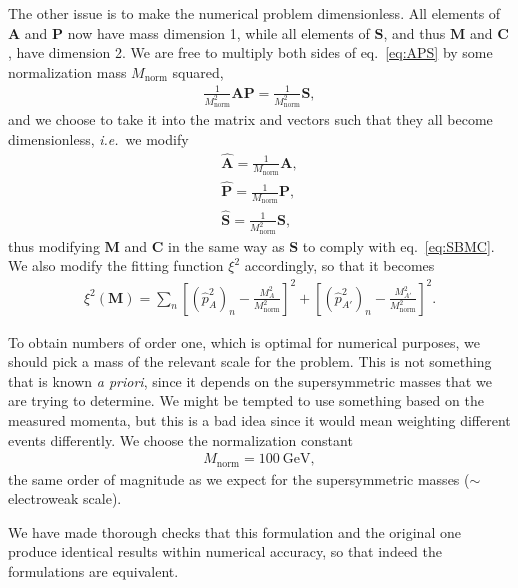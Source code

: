 \documentclass[twoside,english]{uiofysmaster}
\begin{document}
The other issue is to make the numerical problem dimensionless. All elements of $\mathbf{A}$ and $\mathbf{P}$ now have mass dimension 1, while all elements of $\mathbf{S}$, and thus $\mathbf{M}$ and $\mathbf{C}$, have dimension 2. We are free to multiply both sides of eq.\ \eqref{eq:APS} by some normalization mass $M_\mathrm{norm}$ squared,
\begin{align}
	\frac{1}{M_\mathrm{norm}^2} \mathbf{A}\mathbf{P} = \frac{1}{M_\mathrm{norm}^2} \mathbf{S},
\end{align}
and we choose to take it into the matrix and vectors such that they all become dimensionless, {\it i.e.}\ we modify
\begin{align}
	\mathbf{\hat A} = \frac{1}{M_\mathrm{norm}}\mathbf{A},\nonumber \\
	\mathbf{\hat P} = \frac{1}{M_\mathrm{norm}}\mathbf{P},\label{eq:vectors_normalized}\\
	\mathbf{\hat S} = \frac{1}{M_\mathrm{norm}^2}\mathbf{S},\nonumber 
\end{align}
thus modifying $\mathbf{M}$ and $\mathbf{C}$ in the same way as $\mathbf{S}$ to comply with eq.\ \eqref{eq:SBMC}. We also modify the fitting function $\xi^2$ accordingly, so that it becomes
\begin{align}
	\xi^2(\mathbf{M}) = \sum_n \left[(\hat p_{A}^2)_n - \frac{M_A^2}{M_\mathrm{norm}^2}\right]^2 + \left[(\hat p_{A'}^2)_n - \frac{M_{A'}^2}{M_\mathrm{norm}^2}\right]^2.\label{eq:xisquared_modified}
\end{align}

To obtain numbers of order one, which is optimal for numerical purposes, we should pick a mass of the relevant scale for the problem. This is not something that is known {\it a priori}, since it depends on the supersymmetric masses that we are trying to determine. We might be tempted to use something based on the measured momenta, but this is a bad idea since it would mean weighting different events differently. We choose the normalization constant
\begin{align}
	M_\mathrm{norm} = 100 ~\mathrm{GeV},
\end{align}
the same order of magnitude as we expect for the supersymmetric masses ($\sim$ electroweak scale). 

We have made thorough checks that this formulation and the original one produce identical results within numerical accuracy, so that indeed the formulations are equivalent.
\end{document}

